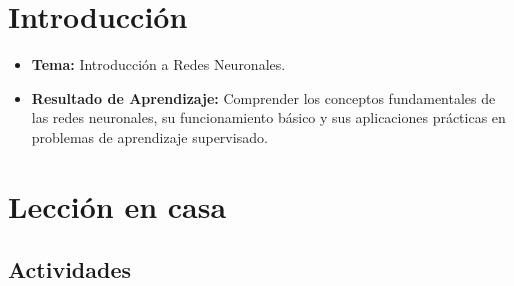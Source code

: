 \documentclass[a4,11pt]{aleph-notas}
\begin{document}
\encabezado


\section*{Introducción}

\begin{itemize}
    \item \textbf{Tema:} Introducción a Redes Neuronales.
    \item \textbf{Resultado de Aprendizaje:} Comprender los conceptos fundamentales de las redes neuronales, su funcionamiento básico y sus aplicaciones prácticas en problemas de aprendizaje supervisado.
\end{itemize}

\section*{Lección en casa}

\subsection*{Actividades}
\end{document}
